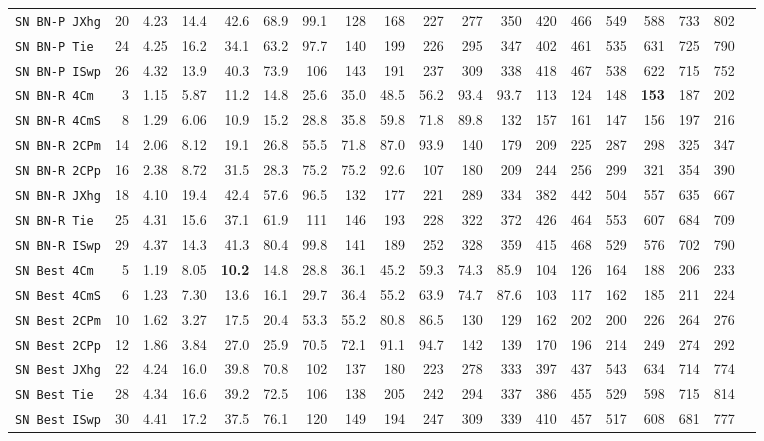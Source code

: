 \begin{tabular}{l | r @{~~} r | r@{~~}r@{~~}r@{~~}r@{~~}r@{~~}r@{~~}r@{~~}r@{~~}r@{~~}r@{~~}r@{~~}r@{~~}r@{~~}r@{~~}r@{~~}r|}
\verb+SN BN-P JXhg+ & 20 & 4.23 & 14.4&42.6&68.9&99.1&128&168&227&277&350&420&466&549&588&733&802\\
\verb+SN BN-P Tie + & 24 & 4.25 & 16.2&34.1&63.2&97.7&140&199&226&295&347&402&461&535&631&725&790\\
\verb+SN BN-P ISwp+ & 26 & 4.32 & 13.9&40.3&73.9&106&143&191&237&309&338&418&467&538&622&715&752\smallskip \\
\verb+SN BN-R 4Cm + & 3 & 1.15 & 5.87&11.2&14.8&25.6&35.0&48.5&56.2&93.4&93.7&113&124&148&\textbf{153}&187&202\\
\verb+SN BN-R 4CmS+ & 8 & 1.29 & 6.06&10.9&15.2&28.8&35.8&59.8&71.8&89.8&132&157&161&147&156&197&216\\
\verb+SN BN-R 2CPm+ & 14 & 2.06 & 8.12&19.1&26.8&55.5&71.8&87.0&93.9&140&179&209&225&287&298&325&347\\
\verb+SN BN-R 2CPp+ & 16 & 2.38 & 8.72&31.5&28.3&75.2&75.2&92.6&107&180&209&244&256&299&321&354&390\\
\verb+SN BN-R JXhg+ & 18 & 4.10 & 19.4&42.4&57.6&96.5&132&177&221&289&334&382&442&504&557&635&667\\
\verb+SN BN-R Tie + & 25 & 4.31 & 15.6&37.1&61.9&111&146&193&228&322&372&426&464&553&607&684&709\\
\verb+SN BN-R ISwp+ & 29 & 4.37 & 14.3&41.3&80.4&99.8&141&189&252&328&359&415&468&529&576&702&790\smallskip \\
\verb+SN Best 4Cm + & 5 & 1.19 & 8.05&\textbf{10.2}&14.8&28.8&36.1&45.2&59.3&74.3&85.9&104&126&164&188&206&233\\
\verb+SN Best 4CmS+ & 6 & 1.23 & 7.30&13.6&16.1&29.7&36.4&55.2&63.9&74.7&87.6&103&117&162&185&211&224\\
\verb+SN Best 2CPm+ & 10 & 1.62 & 3.27&17.5&20.4&53.3&55.2&80.8&86.5&130&129&162&202&200&226&264&276\\
\verb+SN Best 2CPp+ & 12 & 1.86 & 3.84&27.0&25.9&70.5&72.1&91.1&94.7&142&139&170&196&214&249&274&292\\
\verb+SN Best JXhg+ & 22 & 4.24 & 16.0&39.8&70.8&102&137&180&223&278&333&397&437&543&634&714&774\\
\verb+SN Best Tie + & 28 & 4.34 & 16.6&39.2&72.5&106&138&205&242&294&337&386&455&529&598&715&814\\
\verb+SN Best ISwp+ & 30 & 4.41 & 17.2&37.5&76.1&120&149&194&247&309&339&410&457&517&608&681&777\\
\end{tabular}
